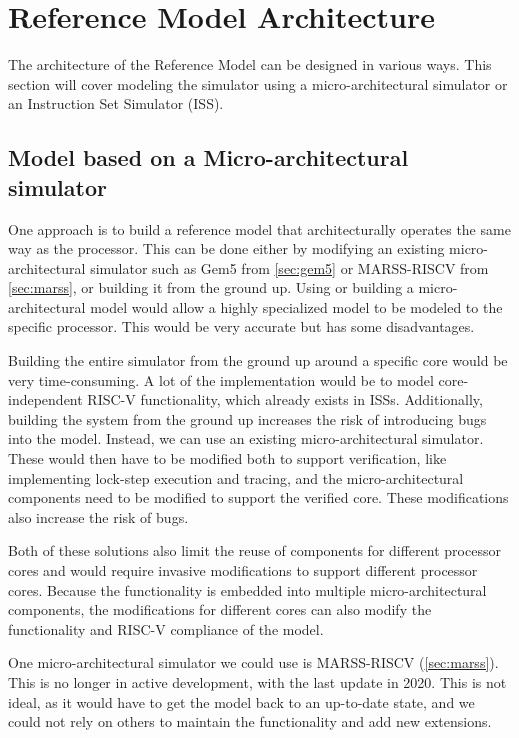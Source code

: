 \section{Reference Model Architecture}
\label{sec:architecture}

The architecture of the Reference Model can be designed in various ways. This section will cover modeling the simulator using a micro-architectural simulator or an Instruction Set Simulator (ISS).

\subsection{Model based on a Micro-architectural simulator}

One approach is to build a reference model that architecturally operates the same way as the processor. This can be done either by modifying an existing micro-architectural simulator such as Gem5 from \cref{sec:gem5} or MARSS-RISCV from \cref{sec:marss}, or building it from the ground up. Using or building a micro-architectural model would allow a highly specialized model to be modeled to the specific processor. This would be very accurate but has some disadvantages.

Building the entire simulator from the ground up around a specific core would be very time-consuming. A lot of the implementation would be to model core-independent RISC-V functionality, which already exists in ISSs. Additionally, building the system from the ground up increases the risk of introducing bugs into the model. Instead, we can use an existing micro-architectural simulator. These would then have to be modified both to support verification, like implementing lock-step execution and tracing, and the micro-architectural components need to be modified to support the verified core. These modifications also increase the risk of bugs. 

Both of these solutions also limit the reuse of components for different processor cores and would require invasive modifications to support different processor cores. Because the functionality is embedded into multiple micro-architectural components, the modifications for different cores can also modify the functionality and RISC-V compliance of the model.

One micro-architectural simulator we could use is MARSS-RISCV (\cref{sec:marss}). This is no longer in active development, with the last update in 2020. This is not ideal, as it would have to get the model back to an up-to-date state, and we could not rely on others to maintain the functionality and add new extensions.

